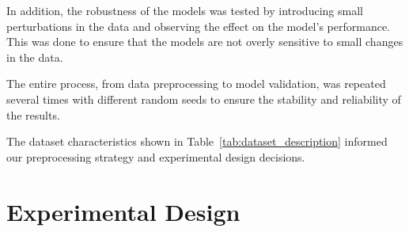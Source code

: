 \documentclass[conference]{IEEEtran}
\begin{document}
In addition, the robustness of the models was tested by introducing small perturbations in the data and observing the effect on the model's performance. This was done to ensure that the models are not overly sensitive to small changes in the data.

The entire process, from data preprocessing to model validation, was repeated several times with different random seeds to ensure the stability and reliability of the results.

The dataset characteristics shown in Table~\ref{tab:dataset_description} informed our preprocessing strategy and experimental design decisions.

\section{Experimental Design}
\end{document}
